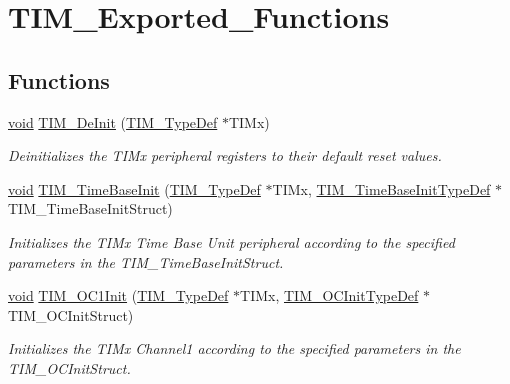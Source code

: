 \hypertarget{group___t_i_m___exported___functions}{}\section{T\+I\+M\+\_\+\+Exported\+\_\+\+Functions}
\label{group___t_i_m___exported___functions}
\subsection*{Functions}
\begin{DoxyCompactItemize}
\item 
\hyperlink{usb__devapi_8h_afabf60e7f57651d6d595a02c75f07cd0}{void} \hyperlink{group___t_i_m___exported___functions_ga1659cc0ce503ac151568e0c7c02b1ba5}{T\+I\+M\+\_\+\+De\+Init} (\hyperlink{struct_t_i_m___type_def}{T\+I\+M\+\_\+\+Type\+Def} $\ast$T\+I\+Mx)
\begin{DoxyCompactList}\small\item\em Deinitializes the T\+I\+Mx peripheral registers to their default reset values. \end{DoxyCompactList}\item 
\hyperlink{usb__devapi_8h_afabf60e7f57651d6d595a02c75f07cd0}{void} \hyperlink{group___t_i_m___exported___functions_ga83fd58c9416802d9638bbe1715c98932}{T\+I\+M\+\_\+\+Time\+Base\+Init} (\hyperlink{struct_t_i_m___type_def}{T\+I\+M\+\_\+\+Type\+Def} $\ast$T\+I\+Mx, \hyperlink{struct_t_i_m___time_base_init_type_def}{T\+I\+M\+\_\+\+Time\+Base\+Init\+Type\+Def} $\ast$T\+I\+M\+\_\+\+Time\+Base\+Init\+Struct)
\begin{DoxyCompactList}\small\item\em Initializes the T\+I\+Mx Time Base Unit peripheral according to the specified parameters in the T\+I\+M\+\_\+\+Time\+Base\+Init\+Struct. \end{DoxyCompactList}\item 
\hyperlink{usb__devapi_8h_afabf60e7f57651d6d595a02c75f07cd0}{void} \hyperlink{group___t_i_m___exported___functions_gafcdb6ff00158862aef7fed5e7a554a3e}{T\+I\+M\+\_\+\+O\+C1\+Init} (\hyperlink{struct_t_i_m___type_def}{T\+I\+M\+\_\+\+Type\+Def} $\ast$T\+I\+Mx, \hyperlink{struct_t_i_m___o_c_init_type_def}{T\+I\+M\+\_\+\+O\+C\+Init\+Type\+Def} $\ast$T\+I\+M\+\_\+\+O\+C\+Init\+Struct)
\begin{DoxyCompactList}\small\item\em Initializes the T\+I\+Mx Channel1 according to the specified parameters in the T\+I\+M\+\_\+\+O\+C\+Init\+Struct. \end{DoxyCompactList}\item 

\end{DoxyCompactItemize}
